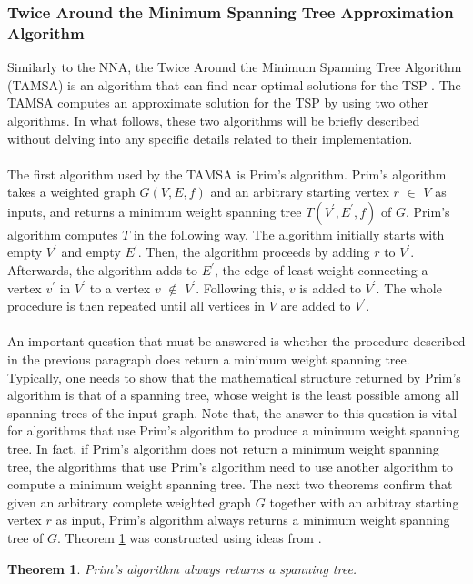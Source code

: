 \documentclass[12pt]{article}
\newtheorem{theorem}[definition]{Theorem}
\numberwithin{equation}{subsection}
\numberwithin{table}{subsection}
\begin{document}
\subsubsection{Twice Around the Minimum Spanning Tree Approximation Algorithm}
\label{TAMSA_SECTION}
Similarly to the NNA, the Twice Around the Minimum Spanning Tree Algorithm (TAMSA) is an algorithm that can find near-optimal solutions for the TSP \cite{cormen_leiserson_rivest_stein}. The TAMSA computes an approximate solution for the TSP by using two other algorithms. In what follows, these two algorithms will be briefly described without delving into any specific details related to their implementation.\\\\
The first algorithm used by the TAMSA is Prim's algorithm. Prim's algorithm takes a weighted graph $G(V,E,f)$ and an arbitrary starting vertex $r$ $\in$ $V$ as inputs, and returns a minimum weight spanning tree $T(V^\prime,E^\prime,f)$ of $G$. Prim's algorithm computes $T$ in the following way. The algorithm initially starts with empty $V^\prime$ and empty $E^\prime$. Then, the algorithm proceeds by adding $r$ to $V^\prime$. Afterwards, the algorithm adds to $E^\prime$, the edge of least-weight connecting a vertex $v^\prime$ in $V^\prime$ to a vertex $v$ $\notin$ $V^\prime$. Following this, $v$ is added to $V^\prime$. The whole procedure is then repeated until all vertices in $V$ are added to $V^\prime$. \cite{harris_hirst_mossinghoff_2008}\\\\
An important question that must be answered is whether the procedure described in the previous paragraph does return a minimum weight spanning tree. Typically, one needs to show that the mathematical structure returned by Prim's algorithm is that of a spanning tree, whose weight is the least possible among all spanning trees of the input graph. Note that, the answer to this question is vital for algorithms that use Prim's algorithm to produce a minimum weight spanning tree. In fact, if Prim's algorithm does not return a minimum weight spanning tree, the algorithms that use Prim's algorithm need to use another algorithm to compute a minimum weight spanning tree. The next two theorems confirm that given an arbitrary complete weighted graph $G$ together with an arbitray starting vertex $r$ as input, Prim's algorithm always returns a minimum weight spanning tree of $G$. Theorem \ref{correctness1} was constructed using ideas from \cite{greedy_algorithms}.
\begin{theorem}
\label{correctness1}
Prim's algorithm always returns a spanning tree. {}
\end{theorem}
\end{document}
